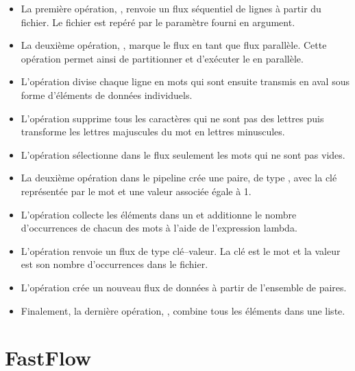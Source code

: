 \begin{itemize}
	\item La premi\`ere op\'eration, , renvoie un flux s\'equentiel de lignes \`a partir du fichier. Le fichier est rep\'er\'e par le param\`etre  fourni en argument.

	\item La deuxi\`eme op\'eration, , marque le flux en tant que flux parall\`ele. Cette op\'eration permet ainsi de partitionner et d'ex\'ecuter le  en parall\`ele.

	\item L'op\'eration  divise chaque ligne en mots qui sont ensuite transmis en aval sous forme d'\'el\'ements de donn\'ees individuels.
	
	\item L'op\'eration  supprime tous les caract\`eres qui ne sont pas des lettres puis transforme les lettres majuscules du mot en lettres minuscules.
	
	\item L'op\'eration  s\'electionne dans le flux seulement les mots qui ne sont pas vides.
	
	\item La deuxi\`eme op\'eration  dans le pipeline cr\'ee une paire, de type , avec la cl\'e repr\'esent\'ee par le mot et une valeur associ\'ee \'egale \`a 1.
	
	\item L'op\'eration  collecte les \'el\'ements dans un  et additionne le nombre d'occurrences de chacun des mots \`a l'aide de l'expression lambda.
	
	\item L'op\'eration  renvoie un flux de type cl\'e--valeur. La cl\'e est le mot et la valeur est son nombre d'occurrences dans le fichier.

	\item L'op\'eration  cr\'ee un nouveau flux de donn\'ees \`a partir de l'ensemble de paires.
	
	\item Finalement, la derni\`ere op\'eration, , combine tous les \'el\'ements dans une liste.
	
	
\end{itemize}


\section{FastFlow}

